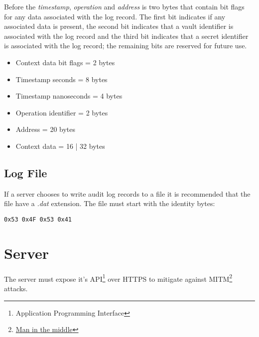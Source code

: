 \documentclass[a4paper,titlepage,oneside]{article}
\renewcommand{\paragraph}{\small}
\begin{document}
\paragraph{Before the \emph{timestamp}, \emph{operation} and \emph{address} is two bytes that contain bit flags for any data associated with the log record. The first bit indicates if any associated data is present, the second bit indicates that a vault identifier is associated with the log record and the third bit indicates that a secret identifier is associated with the log record; the remaining bits are reserved for future use.}

\begin{itemize}
  \item Context data bit flags = 2 bytes
  \item Timestamp seconds = 8 bytes
  \item Timestamp nanoseconds = 4 bytes
  \item Operation identifier = 2 bytes
  \item Address = 20 bytes
  \item Context data = 16 | 32 bytes
\end{itemize}

\subsection{Log File}

\paragraph{If a server chooses to write audit log records to a file it is recommended that the file have a \emph{.dat} extension. The file must start with the identity bytes:}

\begin{verbatim}
0x53 0x4F 0x53 0x41
\end{verbatim}

\section{Server}

\paragraph{The server must expose it's API\footnote{Application Programming Interface} over HTTPS to mitigate against MITM\footnote{\href{https://en.wikipedia.org/wiki/Man-in-the-middle_attack}{Man in the middle}} attacks.}
\end{document}
